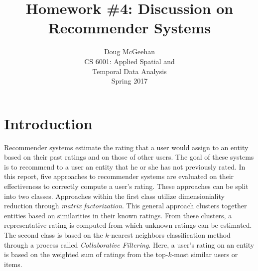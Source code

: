 \documentclass[11pt]{article}
\title{Homework \#4: Discussion on Recommender Systems}
\author{Doug McGeehan\\
		CS 6001: Applied Spatial and \\ Temporal Data Analysis\\
		Spring 2017}
\begin{document}
\maketitle

\section{Introduction}

Recommender systems estimate the rating that a user would assign to an entity based on their past ratings and on those of other users.
The goal of these systems is to recommend to a user an entity that he or she has not previously rated.
In this report, five approaches to recommender systems are evaluated on their effectiveness to correctly compute a user's rating.
These approaches can be split into two classes.
Approaches within the first class utilize dimensioniality reduction through \emph{matrix factorization}.
This general approach clusters together entities based on similarities in their known ratings.
From these clusters, a representative rating is computed from which unknown ratings can be estimated.
The second class is based on the $k$-nearest neighbors classification method through a process called \emph{Collaborative Filtering}.
Here, a user's rating on an entity is based on the weighted sum of ratings from the top-$k$-most similar users or items.
\end{document}
